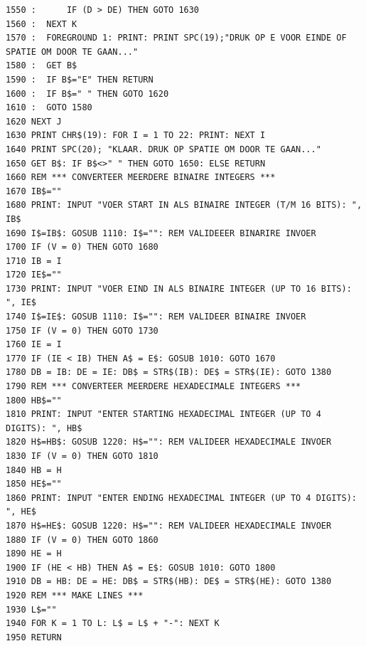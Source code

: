 \begin{tcolorbox}[colback=black,coltext=white]
\verbatimfont{\codefont}
\begin{verbatim}
1550 :      IF (D > DE) THEN GOTO 1630
1560 :  NEXT K
1570 :  FOREGROUND 1: PRINT: PRINT SPC(19);"DRUK OP E VOOR EINDE OF SPATIE OM DOOR TE GAAN..."
1580 :  GET B$
1590 :  IF B$="E" THEN RETURN
1600 :  IF B$=" " THEN GOTO 1620
1610 :  GOTO 1580
1620 NEXT J
1630 PRINT CHR$(19): FOR I = 1 TO 22: PRINT: NEXT I
1640 PRINT SPC(20); "KLAAR. DRUK OP SPATIE OM DOOR TE GAAN..."
1650 GET B$: IF B$<>" " THEN GOTO 1650: ELSE RETURN
1660 REM *** CONVERTEER MEERDERE BINAIRE INTEGERS ***
1670 IB$=""
1680 PRINT: INPUT "VOER START IN ALS BINAIRE INTEGER (T/M 16 BITS): ", IB$
1690 I$=IB$: GOSUB 1110: I$="": REM VALIDEEER BINARIRE INVOER
1700 IF (V = 0) THEN GOTO 1680
1710 IB = I
1720 IE$=""
1730 PRINT: INPUT "VOER EIND IN ALS BINAIRE INTEGER (UP TO 16 BITS): ", IE$
1740 I$=IE$: GOSUB 1110: I$="": REM VALIDEER BINAIRE INVOER
1750 IF (V = 0) THEN GOTO 1730
1760 IE = I
1770 IF (IE < IB) THEN A$ = E$: GOSUB 1010: GOTO 1670
1780 DB = IB: DE = IE: DB$ = STR$(IB): DE$ = STR$(IE): GOTO 1380
1790 REM *** CONVERTEER MEERDERE HEXADECIMALE INTEGERS ***
1800 HB$=""
1810 PRINT: INPUT "ENTER STARTING HEXADECIMAL INTEGER (UP TO 4 DIGITS): ", HB$
1820 H$=HB$: GOSUB 1220: H$="": REM VALIDEER HEXADECIMALE INVOER
1830 IF (V = 0) THEN GOTO 1810
1840 HB = H
1850 HE$=""
1860 PRINT: INPUT "ENTER ENDING HEXADECIMAL INTEGER (UP TO 4 DIGITS): ", HE$
1870 H$=HE$: GOSUB 1220: H$="": REM VALIDEER HEXADECIMALE INVOER
1880 IF (V = 0) THEN GOTO 1860
1890 HE = H
1900 IF (HE < HB) THEN A$ = E$: GOSUB 1010: GOTO 1800
1910 DB = HB: DE = HE: DB$ = STR$(HB): DE$ = STR$(HE): GOTO 1380
1920 REM *** MAKE LINES ***
1930 L$=""
1940 FOR K = 1 TO L: L$ = L$ + "-": NEXT K
1950 RETURN
\end{verbatim}
\end{tcolorbox}
